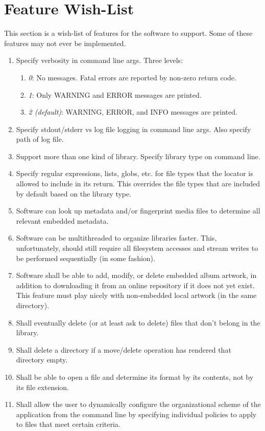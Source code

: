 \documentclass{designdoc}
\begin{document}
\section{Feature Wish-List}
This section is a wish-list of features for the software to support. Some of
these features may not ever be implemented.
\begin{enumerate}
\item Specify verbosity in command line args. Three levels:
  \begin{enumerate}
  \item \textit{0}: No messages. Fatal errors are reported by non-zero return
    code.
  \item \textit{1}: Only WARNING and ERROR messages are printed.
  \item \textit{2 (default)}: WARNING, ERROR, and INFO messages are printed.
  \end{enumerate}
\item Specify stdout/stderr vs log file logging in command line args. Also
  specify path of log file.
\item Support more than one kind of library. Specify library type on command
  line.
\item Specify regular expressions, lists, globs, etc. for file types that
  the locator is allowed to include in its return. This overrides the file
  types that are included by default based on the library type.
\item Software can look up metadata and/or fingerprint media files to determine
  all relevant embedded metadata.
\item Software can be multithreaded to organize libraries faster. This,
  unfortunately, should still require all filesystem accesses and stream writes
  to be performed sequentially (in some fashion).
\item Software shall be able to add, modify, or delete embedded album artwork,
  in addition to downloading it from an online repository if it does not yet
  exist. This feature must play nicely with non-embedded local artwork (in the
  same directory).
\item Shall eventually delete (or at least ask to delete) files that don't
  belong in the library.
\item Shall delete a directory if a move/delete operation has rendered that
  directory empty.
\item Shall be able to open a file and determine its format by its contents,
  not by its file extension.
\item Shall allow the user to dynamically configure the organizational scheme
  of the application from the command line by specifying individual policies to
  apply to files that meet certain criteria.
\end{enumerate}
\end{document}
